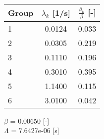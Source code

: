 \begin{center}
\setlength{\extrarowheight}{2.0pt}
\begin{tabular}{lcc}
Group & $\lambda_k$ [1/s] & $\displaystyle \frac{\beta_k}{\beta}$ [-] \\ \hline
1 & 0.0124 & 0.033	\\
2 & 0.0305 & 0.219	\\
3 & 0.1110 & 0.196	\\
4 & 0.3010 & 0.395	\\
5 & 1.1400 & 0.115	\\
6 & 3.0100 & 0.042	\\
\end{tabular}
\end{center}

$\beta$ = 0.00650 [-] \\
$\Lambda$ = 7.6427e-06 [s]

\ifprintanswers
\begin{landscape}


\end{landscape}
\fi


